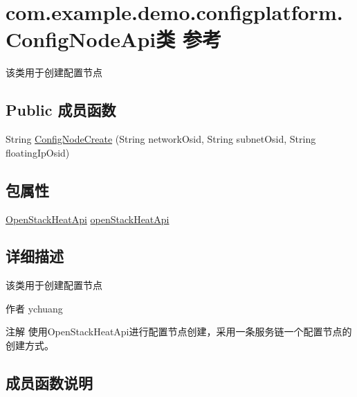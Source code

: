 \hypertarget{classcom_1_1example_1_1demo_1_1configplatform_1_1_config_node_api}{}\section{com.\+example.\+demo.\+configplatform.\+Config\+Node\+Api类 参考}
\label{classcom_1_1example_1_1demo_1_1configplatform_1_1_config_node_api}


该类用于创建配置节点  


\subsection*{Public 成员函数}
\begin{DoxyCompactItemize}
\item 
String \mbox{\hyperlink{classcom_1_1example_1_1demo_1_1configplatform_1_1_config_node_api_a4b2484f9a3eaf8a3647453f5d6765d8f}{Config\+Node\+Create}} (String network\+Osid, String subnet\+Osid, String floating\+Ip\+Osid)
\end{DoxyCompactItemize}
\subsection*{包属性}
\begin{DoxyCompactItemize}
\item 
\mbox{\hyperlink{classcom_1_1example_1_1demo_1_1openstack_1_1_open_stack_heat_api}{Open\+Stack\+Heat\+Api}} \mbox{\hyperlink{classcom_1_1example_1_1demo_1_1configplatform_1_1_config_node_api_aa52cbddcc26c653cf6577478ac534f97}{open\+Stack\+Heat\+Api}}
\end{DoxyCompactItemize}


\subsection{详细描述}
该类用于创建配置节点 

\begin{DoxyAuthor}{作者}
ychuang 
\end{DoxyAuthor}
\begin{DoxyNote}{注解}
使用\+Open\+Stack\+Heat\+Api进行配置节点创建，采用一条服务链一个配置节点的创建方式。 
\end{DoxyNote}


\subsection{成员函数说明}
\mbox{\label{classcom_1_1example_1_1demo_1_1configplatform_1_1_config_node_api_a4b2484f9a3eaf8a3647453f5d6765d8f}} 

